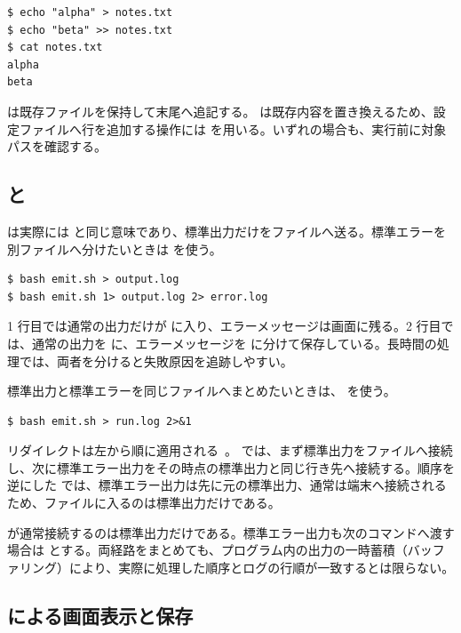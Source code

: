 \begin{lstlisting}[numbers=none, xleftmargin=2\zw]
$ echo "alpha" > notes.txt
$ echo "beta" >> notes.txt
$ cat notes.txt
alpha
beta
\end{lstlisting}

\code{>>} は既存ファイルを保持して末尾へ追記する。\code{>} は既存内容を置き換えるため、設定ファイルへ行を追加する操作には \code{>>} を用いる。いずれの場合も、実行前に対象パスを確認する。

\subsection{ と }

\code{>} は実際には  と同じ意味であり、標準出力だけをファイルへ送る。標準エラーを別ファイルへ分けたいときは  を使う。

\begin{lstlisting}[numbers=none, xleftmargin=2\zw]
$ bash emit.sh > output.log
$ bash emit.sh 1> output.log 2> error.log
\end{lstlisting}

1 行目では通常の出力だけが  に入り、エラーメッセージは画面に残る。2 行目では、通常の出力を  に、エラーメッセージを  に分けて保存している。長時間の処理では、両者を分けると失敗原因を追跡しやすい。

標準出力と標準エラーを同じファイルへまとめたいときは、 を使う。

\begin{lstlisting}[numbers=none, xleftmargin=2\zw]
$ bash emit.sh > run.log 2>&1
\end{lstlisting}

リダイレクトは左から順に適用される~\cite{bash_manual}。 では、まず標準出力をファイルへ接続し、次に標準エラー出力をその時点の標準出力と同じ行き先へ接続する。順序を逆にした  では、標準エラー出力は先に元の標準出力、通常は端末へ接続されるため、ファイルに入るのは標準出力だけである。

\code{|} が通常接続するのは標準出力だけである。標準エラー出力も次のコマンドへ渡す場合は  とする。両経路をまとめても、プログラム内の出力の一時蓄積（バッファリング）により、実際に処理した順序とログの行順が一致するとは限らない。

\subsection{ による画面表示と保存}

